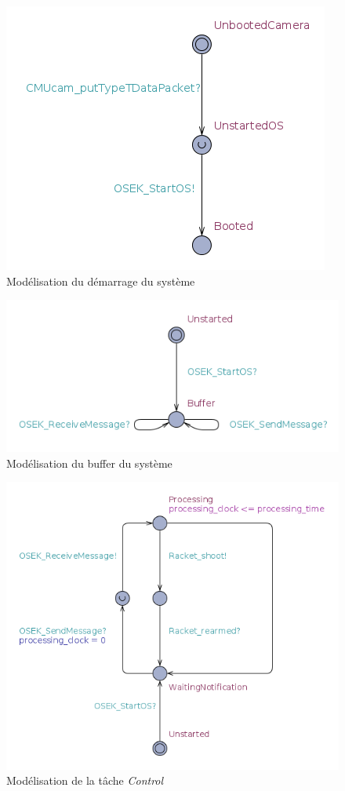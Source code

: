     \begin{figure}[!ht]
      \centering
      \includegraphics[scale=0.5]{./img/uppaal-boot.png}
      \caption{Modélisation du démarrage du système}
    \end{figure}
    
    \begin{figure}[!ht]
      \centering
      \includegraphics[scale=0.5]{./img/uppaal-buffer.png}
      \caption{Modélisation du buffer du système}
    \end{figure}

    \begin{figure}[!ht]
      \centering
      \includegraphics[scale=0.5]{./img/uppaal-task.png}
      \caption{Modélisation de la tâche {\it Control}}
    \end{figure}

